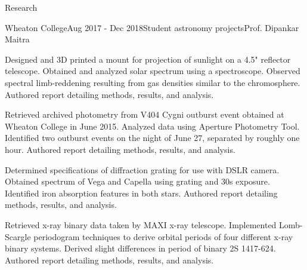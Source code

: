 \documentclass{resume} %
\begin{document}
\begin{rSection}{Research}
\begin{rSubsection}{Wheaton College}{Aug 2017 - Dec 2018}{Student astronomy projects}{Prof. Dipankar Maitra}
\item Designed and 3D printed a mount for projection of sunlight on a 4.5" reflector telescope. Obtained and analyzed solar spectrum using a spectroscope. Observed spectral limb-reddening resulting from gas densities similar to the chromosphere. Authored report detailing methods, results, and analysis.
\item Retrieved archived photometry from V404 Cygni outburst event obtained at Wheaton College in June 2015. Analyzed data using Aperture Photometry Tool. Identified two outburst events on the night of June 27, separated by roughly one hour. Authored report detailing methods, results, and analysis.
\item Determined specifications of diffraction grating for use with DSLR camera. Obtained spectrum of Vega and Capella using grating and 30s exposure. Identified iron absorption features in both stars. Authored report detailing methods, results, and analysis.
\item Retrieved x-ray binary data taken by MAXI x-ray telescope. Implemented Lomb-Scargle periodogram techniques to derive orbital periods of four different x-ray binary systems. Derived slight differences in period of binary 2S 1417-624. Authored report detailing methods, results, and analysis.
\end{rSubsection}


\end{rSection}
\end{document}
